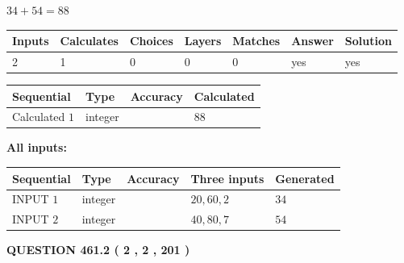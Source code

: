 \documentclass[12pt]{article}
\begin{document}
 

$ %
34 +  %
54=   %
88$
 
 
\noindent{}
 
 

 
   
   
   
   
\noindent\begin{tabular}{|l|l|l|l|l|l|l|}
 \hline
Inputs & Calculates & Choices & Layers & Matches & Answer & Solution \\ \hline
 2  & 
 1  & 
 0
  & 
 0  & 
 0  & 
  yes & 
  yes 
  \\ \hline
 \end{tabular}
   
   
   
   
\noindent{}
   
   
  
  
\noindent\begin{tabular}{|l|l|l|l|}
\hline
 Sequential & Type & Accuracy & Calculated \\ 
\hline
 
 
  Calculated $  1 $ & integer &  & 
  $ 88 $ 
 \\  \hline  
 \end{tabular}
   
   
   
   
\noindent\vspace{0.1in}\hspace{-0.08in} {\textbf{\Large{All inputs: }}}
   
   
  
  
\noindent\begin{tabular}{|l|l|l|l|l|}
\hline
 Sequential & Type & Accuracy & Three inputs & Generated \\ 
\hline
 
 
  INPUT $  1 $ & integer &  & $
 20
 , 
 60
 , 
 2
 $ & $ 34 $ 
 \\  \hline  
 
 
  INPUT $  2 $ & integer &  & $
 40
 , 
 80
 , 
 7
 $ & $ 54 $ 
 \\  \hline  
 \end{tabular}
   
   
  
\vspace{0.2in}
  
{\textbf{\Large{QUESTION
461.2 
 ( 2 , 2 , 201 )
}}}
  
\end{document}
